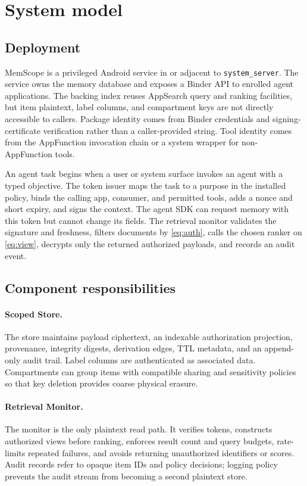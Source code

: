 \section{System model}
\label{sec:system}

\subsection{Deployment}

MemScope is a privileged Android service in or adjacent to \texttt{system\_server}. The service owns the memory database and exposes a Binder API to enrolled agent applications. The backing index reuses AppSearch query and ranking facilities, but item plaintext, label columns, and compartment keys are not directly accessible to callers. Package identity comes from Binder credentials and signing-certificate verification rather than a caller-provided string. Tool identity comes from the AppFunction invocation chain or a system wrapper for non-AppFunction tools.



An agent task begins when a user or system surface invokes an agent with a typed objective. The token issuer maps the task to a purpose in the installed policy, binds the calling app, consumer, and permitted tools, adds a nonce and short expiry, and signs the context. The agent SDK can request memory with this token but cannot change its fields. The retrieval monitor validates the signature and freshness, filters documents by \cref{eq:auth}, calls the chosen ranker on \cref{eq:view}, decrypts only the returned authorized payloads, and records an audit event.

\subsection{Component responsibilities}

\paragraph{Scoped Store.}
The store maintains payload ciphertext, an indexable authorization projection, provenance, integrity digests, derivation edges, TTL metadata, and an append-only audit trail. Label columns are authenticated as associated data. Compartments can group items with compatible sharing and sensitivity policies so that key deletion provides coarse physical erasure.

\paragraph{Retrieval Monitor.}
The monitor is the only plaintext read path. It verifies tokens, constructs authorized views before ranking, enforces result count and query budgets, rate-limits repeated failures, and avoids returning unauthorized identifiers or scores. Audit records refer to opaque item IDs and policy decisions; logging policy prevents the audit stream from becoming a second plaintext store.

